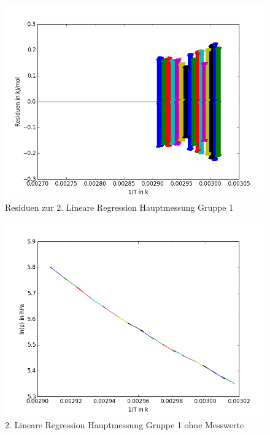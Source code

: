 \documentclass[12pt,a4paper]{article}
\begin{document}
\begin{figure}[H]
\centering
\includegraphics[scale=0.7]{Bilder/residuen_JM_2.png}
\caption{Residuen zur 2. Lineare Regression Hauptmessung Gruppe 1}
\end{figure}
\begin{figure}[H]
\centering
\includegraphics[scale=0.7]{Bilder/linreg_nurlinreg_JM_2.png}
\caption{2. Lineare Regression Hauptmessung Gruppe 1 ohne Messwerte}
\end{figure}
\end{document}
